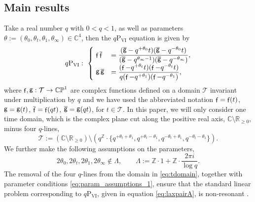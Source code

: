\documentclass[a4paper,reqno,11pt]{amsart}
\numberwithin{equation}{section}
\numberwithin{figure}{section}
\theoremstyle{plain}
\theoremstyle{remark}
\DeclareMathOperator{\sff}{{\sf f}}
\DeclareMathOperator{\sfg}{{\sf g}}
\newcommand\Psix{\textrm{P}_{\textrm{VI}}}
\numberwithin{rhp}{section}
\begin{document}
\subsection{Main results}
Take a real number $q$ with $0<q<1$, as well as parameters $\theta:=(\theta_0,\theta_t,\theta_1,\theta_\infty)\in\mathbb{C}^4$, then the $q\Psix$ equation is given by
\begin{equation}\label{eq:qpvi}
q\Psix:\ \begin{cases}\  \sff\overline{\sff}&=\dfrac{(\overline{\sfg}-q^{+\theta_0}t)(\overline{\sfg}-q^{-\theta_0}t)}{(\overline{\sfg}-q^{\theta_\infty-1})(\overline{\sfg}-q^{-\theta_\infty})},\\
  \   \sfg\overline{\sfg}&=\dfrac{(\sff-q^{+\theta_t}t)(\sff-q^{-\theta_t}t)}{q(\sff-q^{+\theta_1})(\sff-q^{-\theta_1})},
    \end{cases} 
\end{equation}
where $\sff,\sfg:\mathcal{T}\rightarrow \mathbb{CP}^1$ are complex functions defined on a domain $\mathcal{T}$ invariant under multiplication by $q$ and we have used the abbreviated notation $\sff=\sff(t)$, $\sfg=\sfg(t)$, $\overline{\sff}=\sff(qt)$, $\overline{\sfg}=\sfg(qt)$, for $t\in \mathcal{T}$. In this paper, we will only consider one time domain, which is the complex plane cut along the positive real axis, $\mathbb{C}\setminus \mathbb{R}_{\geq 0}$, minus four $q$-lines,
\begin{equation}\label{eq:tdomain}
  \mathcal{T}:=(\mathbb{C}\setminus \mathbb{R}_{\geq 0})\setminus (q^\mathbb{Z}\cdot\{q^{+\theta_t+\theta_1},q^{+\theta_t-\theta_1},q^{-\theta_t+\theta_1},q^{-\theta_t-\theta_1}\}).
\end{equation}
We further make the following assumptions on the parameters,
\begin{equation}\label{eq:param_assumptions_1}
2\theta_0,2\theta_t,2\theta_1,2\theta_\infty\notin \Lambda,\qquad \Lambda:=\mathbb{Z}\cdot 1+\mathbb{Z}\cdot \frac{2\pi i}{\log q}.
\end{equation}
The removal of the four $q$-lines from the domain in \eqref{eq:tdomain}, together with parameter conditions \eqref{eq:param_assumptions_1}, ensure that the standard linear problem corresponding to $q\Psix$, given in equation \eqref{eq:laxpairA}, is non-resonant \cite{joshi_rof_qpvi}.
\end{document}
